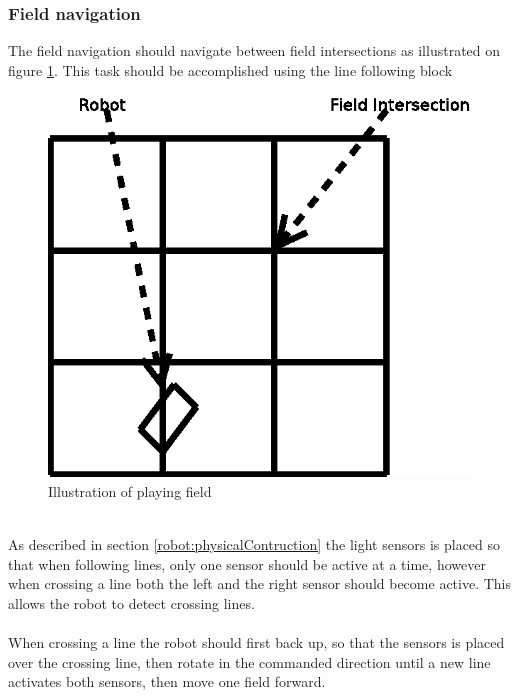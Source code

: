 \documentclass[draft, english, a4paper]{article}
\begin{document}
		\subsubsection{Field navigation} %
		    The field navigation should navigate between field intersections
		    as illustrated on figure \ref{fig:robotFieldNavigation}.
		    This task should be accomplished using the line following block\\
		    \begin{figure}[htp]
                \centering
    	        \includegraphics[scale=0.45]{robotFieldNavigation}
	            \caption{Illustration of playing field}\label{fig:robotFieldNavigation}
            \end{figure}
		    \\
		    As described in section \ref{robot:physicalContruction} the light
		    sensors is placed so that when following lines, only one sensor should
		    be active at a time, however when crossing a line both the left and the
		    right sensor should become active. This allows the robot to detect
		    crossing lines.\\
		    \\
		    When crossing a line the robot should first back up, so that the sensors
		    is placed over the crossing line, then rotate in the commanded direction
		    until a new line activates both sensors, then move one field
		    forward.
\end{document}
